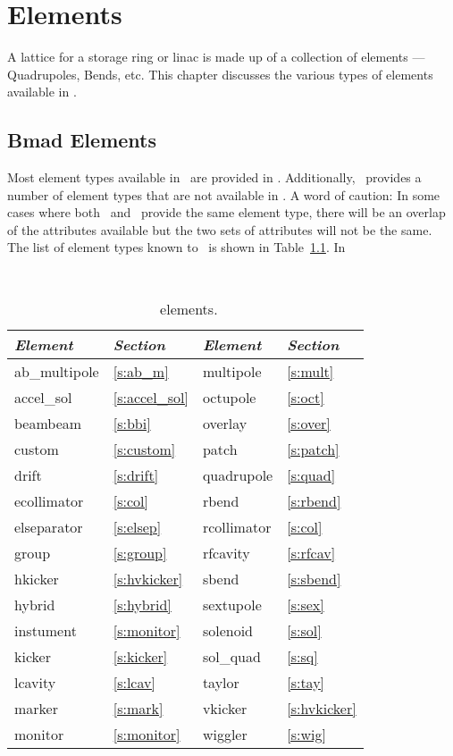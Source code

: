 \chapter{Elements}

A lattice for a storage ring or linac is made up of a collection of
elements --- Quadrupoles, Bends, etc. This chapter discusses the
various types of elements available in \bmad.

\section{Bmad Elements}

Most element types available in \mad\ are provided in \bmad.
Additionally, \bmad\ provides a number of element types that are not
available in \mad.  A word of caution: In some cases where both \mad\
and \bmad\ provide the same element type, there will be an overlap of 
the attributes available but the two sets of attributes will not be the same.
The list of element types known to \bmad\ is shown in Table~\ref{tab:elements}.
In
\begin{table}[h]
{\centering
{\tt
\begin{tabular}{|l|l||l|l|} \hline
  {\it Element} & {\it Section}     & {\it Element} & {\it Section}    \\ \hline
  ab\_multipole & \ref{s:ab_m}      &  multipole    & \ref{s:mult}     \\ \hline
  accel\_sol    & \ref{s:accel_sol} &  octupole     & \ref{s:oct}      \\ \hline
  beambeam      & \ref{s:bbi}       &  overlay      & \ref{s:over}     \\ \hline
  custom        & \ref{s:custom}    &  patch        & \ref{s:patch}    \\ \hline
  drift         & \ref{s:drift}     &  quadrupole   & \ref{s:quad}     \\ \hline
  ecollimator   & \ref{s:col}       &  rbend        & \ref{s:rbend}    \\ \hline
  elseparator   & \ref{s:elsep}     &  rcollimator  & \ref{s:col}      \\ \hline
  group         & \ref{s:group}     &  rfcavity     & \ref{s:rfcav}    \\ \hline
  hkicker       & \ref{s:hvkicker}  &  sbend        & \ref{s:sbend}    \\ \hline
  hybrid        & \ref{s:hybrid}    &  sextupole    & \ref{s:sex}      \\ \hline
  instument     & \ref{s:monitor}   &  solenoid     & \ref{s:sol}      \\ \hline
  kicker        & \ref{s:kicker}    &  sol\_quad    & \ref{s:sq}       \\ \hline
  lcavity       & \ref{s:lcav}      &  taylor       & \ref{s:tay}      \\ \hline
  marker        & \ref{s:mark}      &  vkicker      & \ref{s:hvkicker} \\ \hline
  monitor       & \ref{s:monitor}   &  wiggler      & \ref{s:wig}      \\ \hline
\end{tabular}
}}
\caption{\bmad\ elements.}
\label{tab:elements}\center
\end{table}

